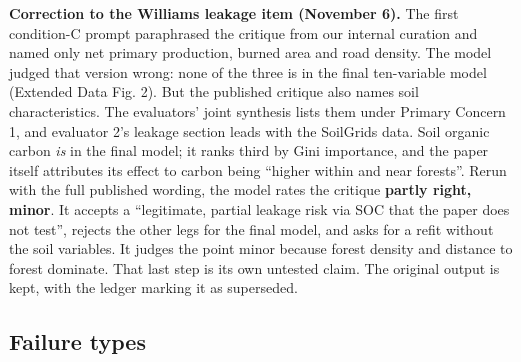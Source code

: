 \documentclass[
  11pt,
  letterpaper,
]{article}
\begin{document}
\textbf{Correction to the Williams leakage item (November 6).} The first
condition-C prompt paraphrased the critique from our internal curation
and named only net primary production, burned area and road density. The
model judged that version wrong: none of the three is in the final
ten-variable model (Extended Data Fig. 2). But the published critique
also names soil characteristics. The evaluators' joint synthesis lists
them under Primary Concern 1, and evaluator 2's leakage section leads
with the SoilGrids data. Soil organic carbon \emph{is} in the final
model; it ranks third by Gini importance, and the paper itself
attributes its effect to carbon being ``higher within and near
forests''. Rerun with the full published wording, the model rates the
critique \textbf{partly right, minor}. It accepts a ``legitimate,
partial leakage risk via SOC that the paper does not test'', rejects the
other legs for the final model, and asks for a refit without the soil
variables. It judges the point minor because forest density and distance
to forest dominate. That last step is its own untested claim. The
original output is kept, with the ledger marking it as superseded.

\subsection{Failure types}\label{failure-types}
\end{document}

